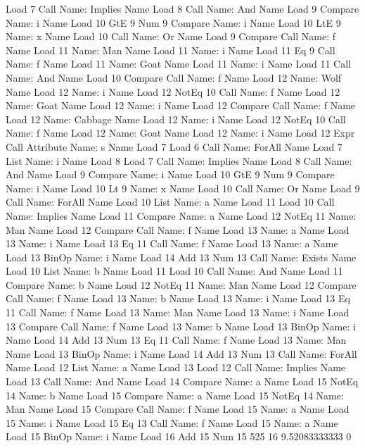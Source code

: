 Load
7
Call
Name: Implies
Name
Load
8
Call
Name: And
Name
Load
9
Compare
Name: i
Name
Load
10
GtE
9
Num
9
Compare
Name: i
Name
Load
10
LtE
9
Name: x
Name
Load
10
Call
Name: Or
Name
Load
9
Compare
Call
Name: f
Name
Load
11
Name: Man
Name
Load
11
Name: i
Name
Load
11
Eq
9
Call
Name: f
Name
Load
11
Name: Goat
Name
Load
11
Name: i
Name
Load
11
Call
Name: And
Name
Load
10
Compare
Call
Name: f
Name
Load
12
Name: Wolf
Name
Load
12
Name: i
Name
Load
12
NotEq
10
Call
Name: f
Name
Load
12
Name: Goat
Name
Load
12
Name: i
Name
Load
12
Compare
Call
Name: f
Name
Load
12
Name: Cabbage
Name
Load
12
Name: i
Name
Load
12
NotEq
10
Call
Name: f
Name
Load
12
Name: Goat
Name
Load
12
Name: i
Name
Load
12
Expr
Call
Attribute
Name: s
Name
Load
7
Load
6
Call
Name: ForAll
Name
Load
7
List
Name: i
Name
Load
8
Load
7
Call
Name: Implies
Name
Load
8
Call
Name: And
Name
Load
9
Compare
Name: i
Name
Load
10
GtE
9
Num
9
Compare
Name: i
Name
Load
10
Lt
9
Name: x
Name
Load
10
Call
Name: Or
Name
Load
9
Call
Name: ForAll
Name
Load
10
List
Name: a
Name
Load
11
Load
10
Call
Name: Implies
Name
Load
11
Compare
Name: a
Name
Load
12
NotEq
11
Name: Man
Name
Load
12
Compare
Call
Name: f
Name
Load
13
Name: a
Name
Load
13
Name: i
Name
Load
13
Eq
11
Call
Name: f
Name
Load
13
Name: a
Name
Load
13
BinOp
Name: i
Name
Load
14
Add
13
Num
13
Call
Name: Exists
Name
Load
10
List
Name: b
Name
Load
11
Load
10
Call
Name: And
Name
Load
11
Compare
Name: b
Name
Load
12
NotEq
11
Name: Man
Name
Load
12
Compare
Call
Name: f
Name
Load
13
Name: b
Name
Load
13
Name: i
Name
Load
13
Eq
11
Call
Name: f
Name
Load
13
Name: Man
Name
Load
13
Name: i
Name
Load
13
Compare
Call
Name: f
Name
Load
13
Name: b
Name
Load
13
BinOp
Name: i
Name
Load
14
Add
13
Num
13
Eq
11
Call
Name: f
Name
Load
13
Name: Man
Name
Load
13
BinOp
Name: i
Name
Load
14
Add
13
Num
13
Call
Name: ForAll
Name
Load
12
List
Name: a
Name
Load
13
Load
12
Call
Name: Implies
Name
Load
13
Call
Name: And
Name
Load
14
Compare
Name: a
Name
Load
15
NotEq
14
Name: b
Name
Load
15
Compare
Name: a
Name
Load
15
NotEq
14
Name: Man
Name
Load
15
Compare
Call
Name: f
Name
Load
15
Name: a
Name
Load
15
Name: i
Name
Load
15
Eq
13
Call
Name: f
Name
Load
15
Name: a
Name
Load
15
BinOp
Name: i
Name
Load
16
Add
15
Num
15
525
16
9.52083333333
0
